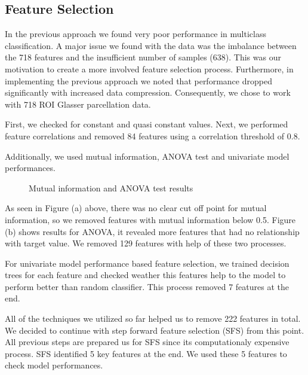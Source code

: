\documentclass[fleqn,moreauthors,10pt]{ds_report}
\begin{document}
\subsection*{Feature Selection}

In the previous approach we found very poor performance in multiclass classification. A major issue we found with the data was the imbalance between the 718 features and the insufficient number of samples (638). This was our motivation to create a more involved feature selection process. Furthermore, in  implementing the previous approach we noted that performance dropped significantly with increased data compression. Consequently, we chose to work with 718 ROI Glasser parcellation data. 

First, we checked for constant and quasi constant values. Next, we performed feature correlations and removed 84 features using a correlation threshold of 0.8. 

Additionally, we used mutual information, ANOVA test and univariate model performances.

\begin{figure}[htbp]
    \centering
    \subfloat[]{
        
        \label{fig:mutual_information}
    }
    \subfloat[]{
        
        \label{fig:anova_test}
    }
    \caption{Mutual information and ANOVA test results}
    \label{fig:joint_dist_grid}
\end{figure}
As seen in Figure (a) above, there was no clear cut off point for mutual information, so we removed features with mutual information below 0.5. Figure (b) shows results for ANOVA, it revealed more features that had no relationship with target value. We removed 129 features with help of these two processes.

For univariate model performance based feature selection, we trained decision trees for each feature and checked weather this features help to the model to perform better than random classifier. This process removed 7 features at the end.

All of the techniques we utilized so far helped us to remove 222 features in total. We decided to continue with step forward feature selection (SFS) from this point. All previous steps are prepared us for SFS since its computationaly expensive process. SFS identified 5 key features at the end. We used these 5 features to check model performances.
\end{document}
